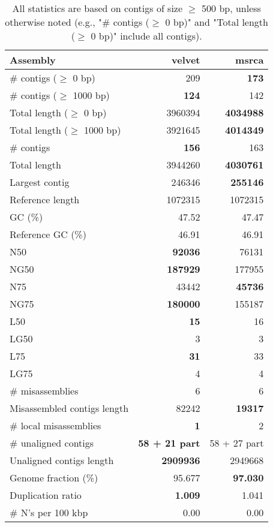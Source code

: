 \documentclass[12pt,a4paper]{article}
\begin{document}
\begin{table}[ht]
\begin{center}
\caption{All statistics are based on contigs of size $\geq$ 500 bp, unless otherwise noted (e.g., "\# contigs ($\geq$ 0 bp)" and "Total length ($\geq$ 0 bp)" include all contigs).}
\begin{tabular}{|l*{2}{|r}|}
\hline
Assembly & velvet & msrca \\ \hline
\# contigs ($\geq$ 0 bp) & 209 & {\bf 173} \\ \hline
\# contigs ($\geq$ 1000 bp) & {\bf 124} & 142 \\ \hline
Total length ($\geq$ 0 bp) & 3960394 & {\bf 4034988} \\ \hline
Total length ($\geq$ 1000 bp) & 3921645 & {\bf 4014349} \\ \hline
\# contigs & {\bf 156} & 163 \\ \hline
Total length & 3944260 & {\bf 4030761} \\ \hline
Largest contig & 246346 & {\bf 255146} \\ \hline
Reference length & 1072315 & 1072315 \\ \hline
GC (\%) & 47.52 & 47.47 \\ \hline
Reference GC (\%) & 46.91 & 46.91 \\ \hline
N50 & {\bf 92036} & 76131 \\ \hline
NG50 & {\bf 187929} & 177955 \\ \hline
N75 & 43442 & {\bf 45736} \\ \hline
NG75 & {\bf 180000} & 155187 \\ \hline
L50 & {\bf 15} & 16 \\ \hline
LG50 & 3 & 3 \\ \hline
L75 & {\bf 31} & 33 \\ \hline
LG75 & 4 & 4 \\ \hline
\# misassemblies & 6 & 6 \\ \hline
Misassembled contigs length & 82242 & {\bf 19317} \\ \hline
\# local misassemblies & {\bf 1} & 2 \\ \hline
\# unaligned contigs & {\bf 58 + 21 part} & 58 + 27 part \\ \hline
Unaligned contigs length & {\bf 2909936} & 2949668 \\ \hline
Genome fraction (\%) & 95.677 & {\bf 97.030} \\ \hline
Duplication ratio & {\bf 1.009} & 1.041 \\ \hline
\# N's per 100 kbp & 0.00 & 0.00 \\ \hline

\end{tabular}
\end{center}
\end{table}
\end{document}
